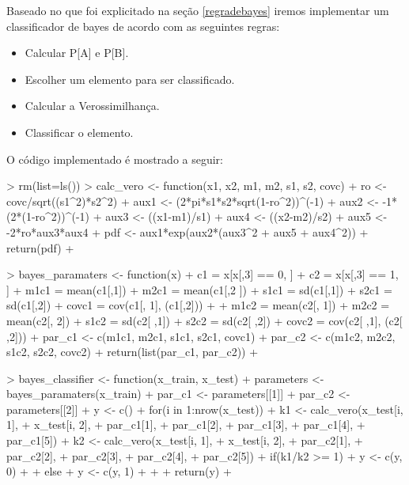 \documentclass[12pt]{article}
\begin{document}
  \par Baseado no que foi explicitado na seção \ref{regradebayes} iremos implementar um classificador de bayes de acordo com as seguintes regras:
  
  \begin{itemize}
  \item Calcular P[A] e P[B].
  \item Escolher um elemento para ser classificado. 
  \item Calcular a Verossimilhança. 
  \item Classificar o elemento.
  \end{itemize}

  \par O código implementado é mostrado a seguir:
  
\begin{Schunk}
\begin{Sinput}
> rm(list=ls())
> calc_vero <- function(x1, x2, m1, m2, s1, s2, covc){
+   ro <- covc/sqrt((s1^2)*s2^2)
+   aux1 <- (2*pi*s1*s2*sqrt(1-ro^2))^(-1)
+   aux2 <- -1*(2*(1-ro^2))^(-1)
+   aux3 <- ((x1-m1)/s1)
+   aux4 <- ((x2-m2)/s2)
+   aux5 <- -2*ro*aux3*aux4
+   pdf <- aux1*exp(aux2*(aux3^2 + aux5 + aux4^2))
+   return(pdf)
+ }
\end{Sinput}
\end{Schunk}

  \par 
\begin{Schunk}
\begin{Sinput}
> bayes_paramaters <- function(x){
+   c1 = x[x[,3] == 0, ]
+   c2 = x[x[,3] == 1, ]
+   m1c1 = mean(c1[,1])
+   m2c1 = mean(c1[,2 ])
+   s1c1 = sd(c1[,1])
+   s2c1 = sd(c1[,2])
+   covc1 = cov(c1[, 1], (c1[,2]))
+   
+   m1c2 = mean(c2[, 1])
+   m2c2 = mean(c2[, 2])
+   s1c2 = sd(c2[ ,1])
+   s2c2 = sd(c2[ ,2])
+   covc2 = cov(c2[ ,1], (c2[ ,2]))
+   par_c1 <- c(m1c1, m2c1, s1c1, s2c1, covc1)
+   par_c2 <- c(m1c2, m2c2, s1c2, s2c2, covc2)
+   return(list(par_c1, par_c2))
+ }
\end{Sinput}
\end{Schunk}

  \par 
\begin{Schunk}
\begin{Sinput}
> bayes_classifier <- function(x_train, x_test){
+   parameters <- bayes_paramaters(x_train)
+   par_c1 <- parameters[[1]]
+   par_c2 <- parameters[[2]]
+   y <- c()
+   for(i in 1:nrow(x_test)){
+     k1 <- calc_vero(x_test[i, 1],
+                     x_test[i, 2],
+                     par_c1[1],
+                     par_c1[2],
+                     par_c1[3],
+                     par_c1[4],
+                     par_c1[5])
+     k2 <- calc_vero(x_test[i, 1],
+                     x_test[i, 2],
+                     par_c2[1],
+                     par_c2[2],
+                     par_c2[3],
+                     par_c2[4],
+                     par_c2[5])
+     if(k1/k2 >= 1){
+       y <- c(y, 0)
+     }
+     else{
+       y <- c(y, 1)
+     }
+   }
+   return(y)
+ }
\end{Sinput}
\end{Schunk}
\end{document}
